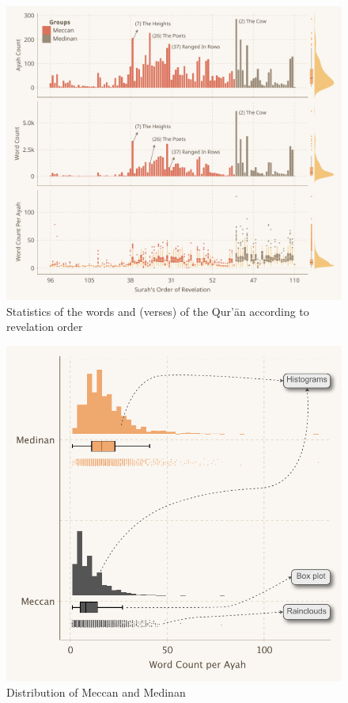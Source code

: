 \begin{figure}[!t]
    \centering
    \includegraphics[width=\textwidth]{img/plot2.pdf}
    \caption{Statistics of the words and   (verses) of the Qur'\=an according to revelation order}
    \label{fig:result_ayah_word_count_rev_order}
\end{figure}

\begin{figure}[!t]
    \centering
    \includegraphics[width=\textwidth]{img/plot3.pdf}
    \caption{Distribution of Meccan and Medinan  }
    \label{fig:result_meccan_medinan_dist}
\end{figure}

